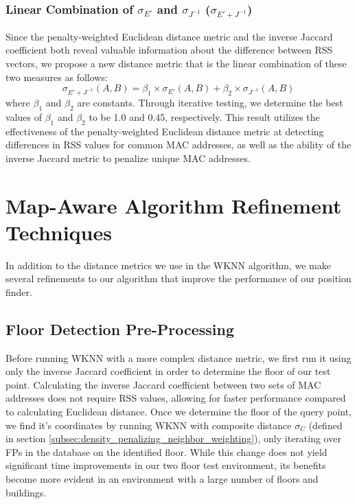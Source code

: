 \documentclass[conference]{IEEEtran}
\begin{document}
\subsubsection{Linear Combination of $\sigma_{E'}$ and $\sigma_{J^{-1}}$ ($\sigma_{E' + J^{-1}}$)}
\indent Since the penalty-weighted Euclidean distance metric and the inverse Jaccard coefficient both reveal valuable information about the difference between RSS vectors, we propose a new distance metric that is the linear combination of these two measures as follows:
\begin{equation}
\label{eq:combined}
\sigma_{E'+J^{-1}}(A, B) = \beta_1\times\sigma_{E'}(A, B)+\beta_2\times\sigma_{J^{-1}}(A, B)
\end{equation}
where $\beta_1$ and $\beta_2$ are constants. Through iterative testing, we determine the best values of $\beta_1$ and $\beta_2$ to be 1.0 and 0.45, respectively. This result utilizes the effectiveness of the penalty-weighted Euclidean distance metric at detecting differences in RSS values for common MAC addresses, as well as the ability of the inverse Jaccard metric to penalize unique MAC addresses.

\section{Map-Aware Algorithm Refinement Techniques}

In addition to the distance metrics we use in the WKNN algorithm, we make several refinements to our algorithm that improve the performance of our position finder. 

\subsection{Floor Detection Pre-Processing}\label{subsec:floor_preprocessing}
\indent Before running WKNN with a more complex distance metric, we first run it using only the inverse Jaccard coefficient in order to determine the floor of our test point. Calculating the inverse Jaccard coefficient between two sets of MAC addresses does not require RSS values, allowing for faster performance compared to calculating Euclidean distance. Once we determine the floor of the query point, we find it's coordinates by running WKNN with composite distance $\sigma_C$ (defined in section \ref{subsec:density_penalizing_neighbor_weighting}), only iterating over FPs in the database on the identified floor. While this change does not yield significant time improvements in our two floor test environment, its benefits become more evident in an environment with a large number of floors and buildings.
\end{document}
